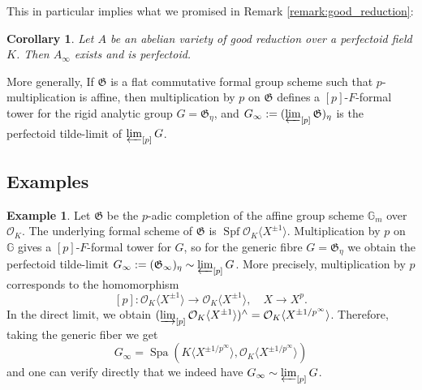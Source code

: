 \documentclass[10pt,oneside]{amsart}
\newtheorem{corollary}[theorem]{Corollary}
\theoremstyle{definition}
\newtheorem{remark}[theorem]{Remark}
\newtheorem*{example}{Example}
\begin{document}
This in particular implies what we promised in Remark \ref{remark:good_reduction}: 
	\begin{corollary}\label{tilde limit exists and is perfectoid in the good reduction case}
		Let $A$ be an abelian variety of good reduction over a perfectoid field $K$. Then $A_\infty$ exists and is perfectoid.
	\end{corollary}
	 	
More generally, If $\mathfrak G$ is a flat commutative formal group scheme such that $p$-multiplication is affine, then multiplication by $p$ on $\mathfrak G$ defines a $[p]$-$F$-formal tower for the rigid analytic group $G=\mathfrak G_\eta$, and  $G_\infty := (\varprojlim_{[p]}\mathfrak G)_\eta$ is the perfectoid tilde-limit of $\varprojlim_{[p]} G$. 

		
\subsection{Examples}				
		
	\begin{example}
		Let $\mathfrak G$ be the $p$-adic completion of the affine group scheme $\mathbb G_m$ over $\mathcal O_K$. The underlying formal scheme of $\mathfrak G$ is $\operatorname {Spf} \mathcal O_K\langle X^{\pm 1} \rangle$.  Multiplication by $p$ on $\mathbb G$ gives a $[p]$-$F$-formal tower for $G$, so for the generic fibre $G=\mathfrak G_\eta$ we obtain the perfectoid tilde-limit $G_\infty := (\mathfrak G_\infty)_{\eta} \sim \varprojlim_{[p]} G$. More precisely,  multiplication by $p$ corresponds to the homomorphism
		\[[p]:\mathcal O_K\langle X^{\pm 1} \rangle\rightarrow  \mathcal O_K\langle X^{\pm 1} \rangle, \quad X\rightarrow X^{p}.\]
		In the direct limit, we obtain $   (\varinjlim_{[p]} \mathcal O_K\langle X^{\pm 1} \rangle  )^{\wedge} = \mathcal O_K\langle  X^{\pm 1/p^\infty} \rangle$.  Therefore, taking the generic fiber we get
		$$G_\infty = \operatorname{Spa}(K\langle X^{\pm 1/p^\infty} \rangle,\mathcal O_K\langle X^{\pm 1/p^\infty} \rangle)$$
		and one can verify directly that we indeed have $G_\infty \sim \varprojlim_{[p]} G$.
	\end{example}
	
\end{document}
